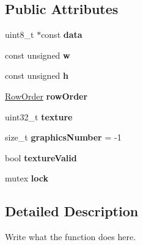 \subsection*{Public Attributes}
\begin{DoxyCompactItemize}
\item 
\hypertarget{structImage_1_1data__t_ac67fc276ee2d36b128b55765d3c17e34}{uint8\+\_\+t $\ast$const {\bfseries data}}\label{structImage_1_1data__t_ac67fc276ee2d36b128b55765d3c17e34}

\item 
\hypertarget{structImage_1_1data__t_a96f2d68563d824c50271ec4bd9678a90}{const unsigned {\bfseries w}}\label{structImage_1_1data__t_a96f2d68563d824c50271ec4bd9678a90}

\item 
\hypertarget{structImage_1_1data__t_af65617c507d10138bd17ab0f2b168c18}{const unsigned {\bfseries h}}\label{structImage_1_1data__t_af65617c507d10138bd17ab0f2b168c18}

\item 
\hypertarget{structImage_1_1data__t_a421352aef192cbfbe3573553602b308d}{\hyperlink{classImage_a856d0983e089ff127d0bcad3828c1aab}{Row\+Order} {\bfseries row\+Order}}\label{structImage_1_1data__t_a421352aef192cbfbe3573553602b308d}

\item 
\hypertarget{structImage_1_1data__t_a18bba5bf2463c72c13fd56ec736259e9}{uint32\+\_\+t {\bfseries texture}}\label{structImage_1_1data__t_a18bba5bf2463c72c13fd56ec736259e9}

\item 
\hypertarget{structImage_1_1data__t_ae36abf1f11268ef7fe59687c73aca3cf}{size\+\_\+t {\bfseries graphics\+Number} = -\/1}\label{structImage_1_1data__t_ae36abf1f11268ef7fe59687c73aca3cf}

\item 
\hypertarget{structImage_1_1data__t_a149c957f170d9885b4b7245d10f93f3b}{bool {\bfseries texture\+Valid}}\label{structImage_1_1data__t_a149c957f170d9885b4b7245d10f93f3b}

\item 
\hypertarget{structImage_1_1data__t_af8a117a1f656faa849809e187720e969}{mutex {\bfseries lock}}\label{structImage_1_1data__t_af8a117a1f656faa849809e187720e969}

\end{DoxyCompactItemize}


\subsection{Detailed Description}
Write what the function does here. 



